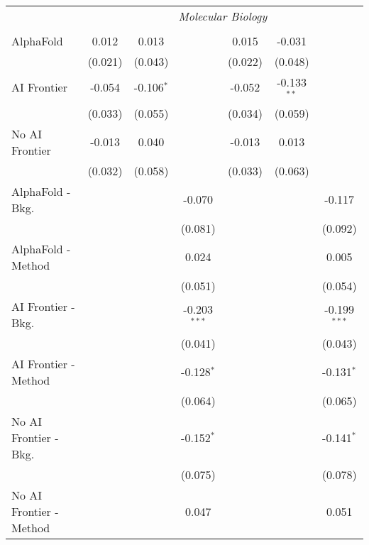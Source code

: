 \begin{tabular}{lcccccc}
 & \multicolumn{6}{c}{\textit{Molecular Biology}} \\ \\
   AlphaFold               & 0.012   & 0.013        &                & 0.015   & -0.031        &   \\   
                           & (0.021) & (0.043)      &                & (0.022) & (0.048)       &   \\   
   AI Frontier             & -0.054  & -0.106$^{*}$ &                & -0.052  & -0.133$^{**}$ &   \\   
                           & (0.033) & (0.055)      &                & (0.034) & (0.059)       &   \\   
   No AI Frontier          & -0.013  & 0.040        &                & -0.013  & 0.013         &   \\   
                           & (0.032) & (0.058)      &                & (0.033) & (0.063)       &   \\   
   AlphaFold - Bkg.        &         &              & -0.070         &         &               & -0.117\\   
                           &         &              & (0.081)        &         &               & (0.092)\\   
   AlphaFold - Method      &         &              & 0.024          &         &               & 0.005\\   
                           &         &              & (0.051)        &         &               & (0.054)\\   
   AI Frontier - Bkg.      &         &              & -0.203$^{***}$ &         &               & -0.199$^{***}$\\   
                           &         &              & (0.041)        &         &               & (0.043)\\   
   AI Frontier - Method    &         &              & -0.128$^{*}$   &         &               & -0.131$^{*}$\\   
                           &         &              & (0.064)        &         &               & (0.065)\\   
   No AI Frontier - Bkg.   &         &              & -0.152$^{*}$   &         &               & -0.141$^{*}$\\   
                           &         &              & (0.075)        &         &               & (0.078)\\   
   No AI Frontier - Method &         &              & 0.047          &         &               & 0.051\\   

\end{tabular}
